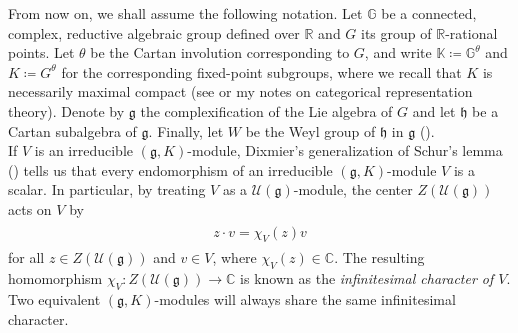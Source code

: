 \noindent From now on, we shall assume the following notation. Let $\mathbb{G}$ be a connected, complex, reductive algebraic group defined over $\mathbb{R}$ and $G$ its group of $\mathbb{R}$-rational points. Let $\theta$ be the Cartan involution corresponding to $G$, and write $\mathbb{K} \coloneqq \mathbb{G}^\theta$ and $K \coloneqq G^\theta$ for the corresponding fixed-point subgroups, where we recall that $K$ is necessarily maximal compact (see \cite[\S 3]{AC09} or my notes on categorical representation theory). Denote by $\mathfrak{g}$ the complexification of the Lie algebra of $G$ and let $\mathfrak{h}$ be a Cartan subalgebra of $\mathfrak{g}$. Finally, let $W$ be the Weyl group of $\mathfrak{h}$ in $\mathfrak{g}$ (\cite[Definition 0.2.5]{Vog81}).\\

\noindent If $V$ is an irreducible $(\mathfrak{g}, K)$-module, Dixmier's generalization of Schur's lemma (\cite[Proposition 5.19]{Kna13}) tells us that every endomorphism of an irreducible $(\mathfrak{g}, K)$-module $V$ is a scalar. In particular, by treating $V$ as a $\mathcal{U}(\mathfrak{g})$-module, the center $Z(\mathcal{U}(\mathfrak{g}))$ acts on $V$ by
\begin{align*}
\begin{split}
z \cdot v = \chi_V(z)v
\end{split}
\end{align*}
\noindent for all $z \in Z(\mathcal{U}(\mathfrak{g}))$ and $v \in V$, where $\chi_V(z)\in\mathbb{C}$. The resulting homomorphism $\chi_V : Z(\mathcal{U}(\mathfrak{g})) \to \mathbb{C}$ is known as the {\em infinitesimal character of $V$}. Two equivalent $(\mathfrak{g}, K)$-modules will always share the same infinitesimal character.\\

